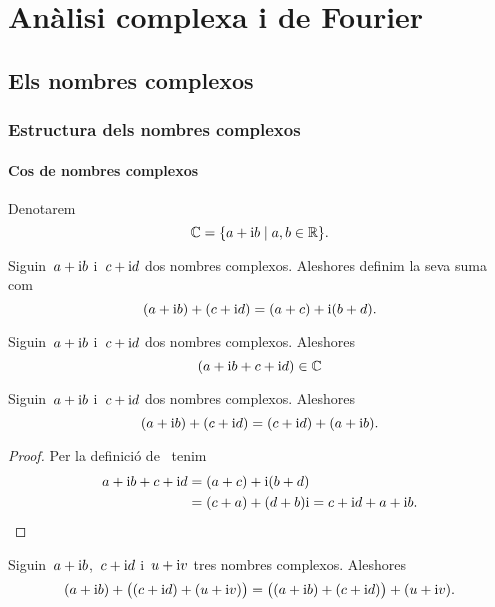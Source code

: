 \documentclass[../Apunts.tex]{subfiles}
\begin{document}
\part{Anàlisi complexa i de Fourier}
\chapter{Els nombres complexos}
\section{Estructura dels nombres complexos}
	\subsection{Cos de nombres complexos}
	\begin{notation}
		\label{notation:cos de nombres complexos}
		Denotarem
		\[\mathbb{C}=\{a+\mathrm{i} b\mid a,b\in\mathbb{R}\}.\]
	\end{notation}
	\begin{definition}
		\label{def:suma de nombres complexos}
		Siguin~\(a+\mathrm{i} b\) i~\(c+\mathrm{i} d\) dos nombres complexos.
		Aleshores definim la seva suma com
		\[(a+\mathrm{i} b)+(c+\mathrm{i} d)=(a+c)+\mathrm{i}(b+d).\]
	\end{definition}
	\begin{observation}
		\label{obs:els nombres complexos estan tancats per la suma}
		Siguin~\(a+\mathrm{i} b\) i~\(c+\mathrm{i} d\) dos nombres complexos.
		Aleshores
		\[(a+\mathrm{i} b+c+\mathrm{i} d)\in\mathbb{C}\]
	\end{observation}
	\begin{proposition}
		\label{prop:els nombres complexos commuten per la suma}
		\label{prop:el producte de nombres complexos és commutatiu}
		Siguin~\(a+\mathrm{i} b\) i~\(c+\mathrm{i} d\) dos nombres complexos.
		Aleshores
		\[(a+\mathrm{i} b)+(c+\mathrm{i} d)=(c+\mathrm{i} d)+(a+\mathrm{i} b).\]
	\end{proposition}
	\begin{proof}
		Per la definició de~ tenim
		\begin{align*}
			a+\mathrm{i} b+c+\mathrm{i} d&=(a+c)+\mathrm{i}(b+d) \\
			&=(c+a)+(d+b)\mathrm{i}=c+\mathrm{i} d+a+\mathrm{i} b.\qedhere
		\end{align*}
	\end{proof}
	\begin{proposition}
		\label{prop:els nombres complexos són associatius per la suma}
		Siguin~\(a+\mathrm{i} b\),~\(c+\mathrm{i} d\) i~\(u+\mathrm{i} v\) tres nombres complexos.
		Aleshores
		\[
			(a+\mathrm{i} b)+\big((c+\mathrm{i} d)+(u+\mathrm{i} v)\big) = 
			\big((a+\mathrm{i} b)+(c+\mathrm{i} d)\big)+(u+\mathrm{i} v).
		\]
	\end{proposition}
\end{document}
